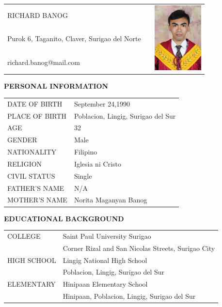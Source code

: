 \documentclass[12pt]{report}
\newcommand{\authord}{
    Richard Banog %
}
\begin{document}
\begin{spacing}{1.55}
\newpage

\begin{tabularx}{\linewidth}{@{}lXr}
    \MakeUppercase{\authord} && \multirow{3}{*}{\includegraphics[width=1in]{img/banog}} \\
    Purok 6, Taganito, Claver, Surigao del Norte && \\
    richard.banog@mail.com && \\
\end{tabularx}

\vspace{20pt}

\textbf{PERSONAL INFORMATION}

\vspace{-10pt}
\hrulefill

\begin{tabular}{@{}l@{ : }l}
    DATE OF BIRTH & September 24,1990 \\
    PLACE OF BIRTH & Poblacion, Lingig, Surigao del Sur \\
    AGE & 32 \\
    GENDER & Male \\
    NATIONALITY & Filipino \\
    RELIGION & Iglesia ni Cristo \\
    CIVIL STATUS & Single  \\
    FATHER'S NAME & N/A \\
    MOTHER'S NAME &  Norita Maganyan Banog\\
\end{tabular}

\vspace{20pt}

\textbf{EDUCATIONAL BACKGROUND}

\vspace{-10pt}
\hrulefill

\begin{tabular}{@{}l@{ : }l}
    COLLEGE & Saint Paul University Surigao \\
    & Corner Rizal and San Nicolas Streets, Surigao City \\
    HIGH SCHOOL & Lingig National High School \\
    & Poblacion, Lingig, Surigao del Sur \\
    ELEMENTARY & Hinipaan Elementary School \\
    & Hinipaan, Poblacion, Lingig, Surigao del Sur \\
\end{tabular}

\end{spacing}
\end{document}
